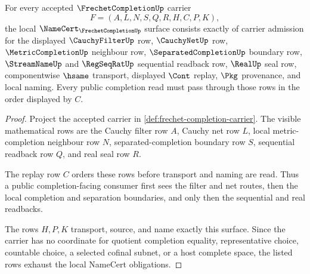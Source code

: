 \begin{theorem}\label{thm:frechet-completion-namecert-obligations}
For every accepted $\FrechetCompletionUp$ carrier
$$
F=(A,L,N,S,Q,R,H,C,P,K),
$$
the local $\NameCert_{\FrechetCompletionUp}$ surface consists exactly of carrier admission for the displayed $\CauchyFilterUp$ row, $\CauchyNetUp$ row, $\MetricCompletionUp$ neighbour row, $\SeparatedCompletionUp$ boundary row, $\StreamNameUp$ and $\RegSeqRatUp$ sequential readback row, $\RealUp$ seal row, componentwise $\hsame$ transport, displayed $\Cont$ replay, $\Pkg$ provenance, and local naming. Every public completion read must pass through those rows in the order displayed by $C$.
\end{theorem}
\begin{proof}
Project the accepted carrier in \autoref{def:frechet-completion-carrier}. The visible mathematical rows are the Cauchy filter row $A$, Cauchy net row $L$, local metric-completion neighbour row $N$, separated-completion boundary row $S$, sequential readback row $Q$, and real seal row $R$.

The replay row $C$ orders these rows before transport and naming are read. Thus a public completion-facing consumer first sees the filter and net routes, then the local completion and separation boundaries, and only then the sequential and real readbacks.

The rows $H,P,K$ transport, source, and name exactly this surface. Since the carrier has no coordinate for quotient completion equality, representative choice, countable choice, a selected cofinal subnet, or a host complete space, the listed rows exhaust the local NameCert obligations.
\end{proof}

